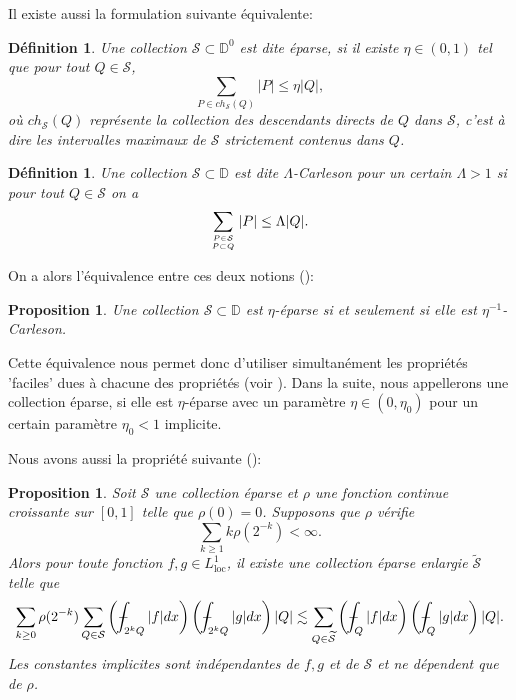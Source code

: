 \documentclass[11pt]{amsart}
\newtheorem{definition}[theorem]{D\'efinition}
\newtheorem{proposition}[theorem]{Proposition}
\newcommand{\ic}{\mathcal}
\newcommand{\loc}{\text{loc}}
\newcommand{\mcS}{{\mathcal S}}
\newcommand{\Dy}{{\mathbb D}}
\def\Xint#1{\mathchoice
   {\XXint\displaystyle\textstyle{#1}}%
   {\XXint\textstyle\scriptstyle{#1}}%
   {\XXint\scriptstyle\scriptscriptstyle{#1}}%
   {\XXint\scriptscriptstyle\scriptscriptstyle{#1}}%
   \!\int}
\def\XXint#1#2#3{{\setbox0=\hbox{$#1{#2#3}{\int}$}
     \vcenter{\hbox{$#2#3$}}\kern-.5\wd0}}
\def\aver#1{\Xint-_{#1}}
\begin{document}
Il existe aussi la formulation suivante \'equivalente:

\begin{definition} \label{def:sparsebis} Une collection ${\mathcal S} \subset \Dy^0$ est dite {\'eparse}, si il existe $\eta \in (0,1)$ tel que pour tout $Q \in \ic S$, 
\[
\sum_{P \in ch_{\ic S}\left( Q\right)} |P| \leq \eta |Q|,
\]
o\`u $ch_{\ic S}(Q)$ repr\'esente la collection des descendants directs de $Q$ dans $\ic S$, c'est \`a dire les intervalles maximaux de $\ic S$ strictement contenus dans $Q$.
\end{definition}


\begin{definition}\label{def:carleson} Une collection ${\mathcal S} \subset \Dy$ est dite $\Lambda$-{\it Carleson} pour un certain $\Lambda> 1$ si pour tout $Q\in {\mathcal S}$ on a
$$ \sum_{\genfrac{}{}{0pt}{}{P\in{\mathcal S}}{P\subset Q}} |P| \leq \Lambda |Q|.$$
\end{definition}

On a alors l'\'equivalence entre ces deux notions (\cite[Lemme 6.3]{LernerNazarov}):

\begin{proposition} Une collection ${\mathcal S} \subset \Dy$ est $\eta$-\'eparse si et seulement si elle est $\eta^{-1}$-Carleson.
\end{proposition}

Cette \'equivalence nous permet donc d'utiliser simultan\'ement les propri\'et\'es 'faciles' dues \`a chacune des propri\'et\'es (voir \cite{LernerNazarov}). Dans la suite, nous appellerons une collection \'eparse, si elle est $\eta$-\'eparse avec un param\`etre $\eta\in (0,\eta_0)$ pour un certain param\`etre $\eta_0<1$ implicite.

Nous avons aussi la propri\'et\'e suivante (\cite[Sections 12-13]{LernerNazarov}):

\begin{proposition} \label{prop:enlarge_sparse} Soit ${\mathcal S}$ une collection \'eparse et $\rho$ une fonction continue croissante sur $[0,1]$ telle que $\rho(0)=0$. Supposons que $\rho$ v\'erifie
$$ \sum_{k\geq 1} k \rho(2^{-k}) <\infty.$$ 
Alors pour toute fonction $f,g\in L^1_{\loc}$, il existe une collection \'eparse enlargie $\widetilde \mcS$ telle que
$$ \sum_{k\geq 0} \rho(2^{-k}) \sum_{Q\in \mcS} \left(\aver{2^k Q} |f| dx \right)\left(\aver{2^k Q} |g| dx \right) |Q| \lesssim  \sum_{Q\in \widetilde \mcS} \left(\aver{Q} |f| dx \right)\left(\aver{Q} |g| dx \right) |Q|.$$
Les constantes implicites sont ind\'ependantes de $f,g$ et de $\mcS$ et ne d\'ependent que de $\rho$.
\end{proposition}
\end{document}

